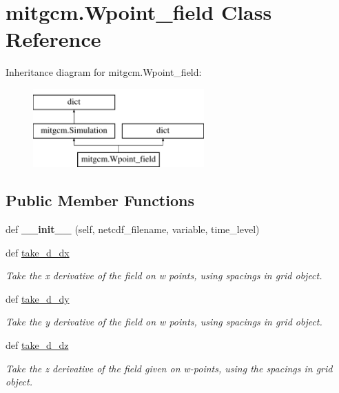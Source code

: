 \hypertarget{classmitgcm_1_1Wpoint__field}{}\section{mitgcm.\+Wpoint\+\_\+field Class Reference}
\label{classmitgcm_1_1Wpoint__field}
Inheritance diagram for mitgcm.\+Wpoint\+\_\+field\+:\begin{figure}[H]
\begin{center}
\leavevmode
\includegraphics[height=3.000000cm]{classmitgcm_1_1Wpoint__field}
\end{center}
\end{figure}
\subsection*{Public Member Functions}
\begin{DoxyCompactItemize}
\item 
\hypertarget{classmitgcm_1_1Wpoint__field_a2a5c51740d3b21316f8a47e14ff948bf}{}def {\bfseries \+\_\+\+\_\+init\+\_\+\+\_\+} (self, netcdf\+\_\+filename, variable, time\+\_\+level)\label{classmitgcm_1_1Wpoint__field_a2a5c51740d3b21316f8a47e14ff948bf}

\item 
def \hyperlink{classmitgcm_1_1Wpoint__field_a9d36e2a9cc0545fb08a7b914968aa75a}{take\+\_\+d\+\_\+dx}
\begin{DoxyCompactList}\small\item\em Take the x derivative of the field on w points, using spacings in grid object. \end{DoxyCompactList}\item 
def \hyperlink{classmitgcm_1_1Wpoint__field_a669146364af5537c435957e297b41f57}{take\+\_\+d\+\_\+dy}
\begin{DoxyCompactList}\small\item\em Take the y derivative of the field on w points, using spacings in grid object. \end{DoxyCompactList}\item 
def \hyperlink{classmitgcm_1_1Wpoint__field_a7edd07d71d411e7f41acb496cc054bd0}{take\+\_\+d\+\_\+dz}
\begin{DoxyCompactList}\small\item\em Take the z derivative of the field given on w-\/points, using the spacings in grid object. \end{DoxyCompactList}\end{DoxyCompactItemize}
